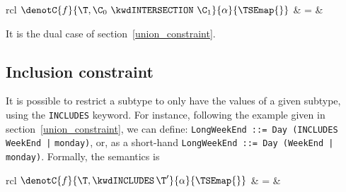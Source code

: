 \medskip

\noindent
\begin{tabular}{rcl}
    $\denotC{f}{\T,\C_0 \,\, \kwdINTERSECTION \,\,
     \C_1}{\alpha}{\TSEmap{}}$
  & \hspace*{-4mm} = & \\
\end{tabular}

\medskip

\noindent
It is the dual case of section~\ref{union_constraint}.


\subsection{Inclusion constraint}\label{contained_type_constraint}

It is possible to restrict a subtype to only have the values of a
given subtype, using the \texttt{\small INCLUDES} keyword. For instance,
following the example given in section~\ref{union_constraint}, we can
define: \texttt{\small LongWeekEnd ::= Day (INCLUDES WeekEnd |}
\texttt{monday}\texttt{\small )}, or, as a short-hand
\texttt{\small LongWeekEnd ::= Day (WeekEnd |}
\texttt{monday}\texttt{\small )}. Formally, the semantics is

\medskip

\noindent
\begin{tabular}{rcl}
    $\denotC{f}{\T,\kwdINCLUDES \, \T'}{\alpha}{\TSEmap{}}$
  & \hspace*{-4mm} = & \hspace*{-4mm}\\
\end{tabular}


